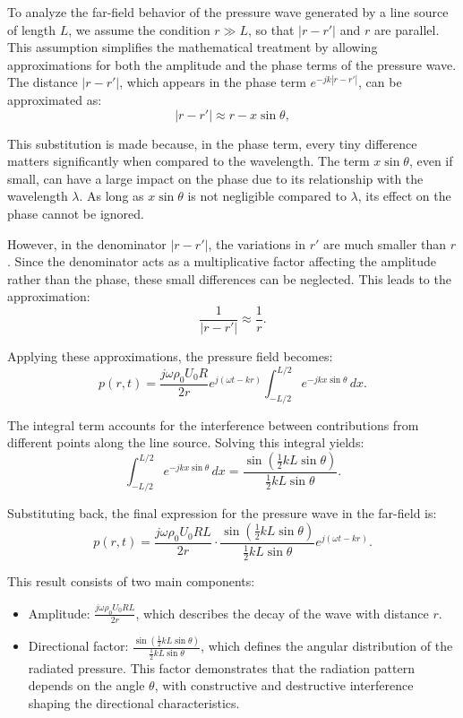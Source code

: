 \documentclass[a4paper]{article}
\begin{document}
To analyze the far-field behavior of the pressure wave generated by a line source of length \( L \), we assume the condition \( r \gg L \), so that \( |r - r'| \) and \( r \) are parallel. This assumption simplifies the mathematical treatment by allowing approximations for both the amplitude and the phase terms of the pressure wave.
The distance \( |r - r'| \), which appears in the phase term \( e^{-j k |r - r'|} \), can be approximated as:
\[
|r - r'| \approx r - x \sin \theta,
\]

This substitution is made because, in the phase term, every tiny difference matters significantly when compared to the wavelength. The term \( x \sin \theta \), even if small, can have a large impact on the phase due to its relationship with the wavelength \( \lambda \). As long as \( x \sin \theta \) is not negligible compared to \( \lambda \), its effect on the phase cannot be ignored.

However, in the denominator \( |r - r'| \), the variations in \( r' \) are much smaller than \( r \). Since the denominator acts as a multiplicative factor affecting the amplitude rather than the phase, these small differences can be neglected. This leads to the approximation:
\[
\frac{1}{|r - r'|} \approx \frac{1}{r}.
\]



Applying these approximations, the pressure field becomes:
\[
p(r, t) = \frac{j \omega \rho_0 U_0 R}{2 r} e^{j (\omega t - k r)} \int_{-L/2}^{L/2} e^{-j k x \sin \theta} \, dx.
\]

The integral term accounts for the interference between contributions from different points along the line source. Solving this integral yields:
\[
\int_{-L/2}^{L/2} e^{-j k x \sin \theta} \, dx = \frac{\sin \left( \frac{1}{2} k L \sin \theta \right)}{\frac{1}{2} k L \sin \theta}.
\]

Substituting back, the final expression for the pressure wave in the far-field is:
\[
p(r, t) = \frac{j \omega \rho_0 U_0 R L}{2 r} \cdot \frac{\sin \left( \frac{1}{2} k L \sin \theta \right)}{\frac{1}{2} k L \sin \theta} e^{j (\omega t - k r)}.
\]

This result consists of two main components:
\begin{itemize}
    \item Amplitude: \(\frac{j \omega \rho_0 U_0 R L}{2 r}\), which describes the decay of the wave with distance \( r \).
\item Directional factor: \(\frac{\sin \left( \frac{1}{2} k L \sin \theta \right)}{\frac{1}{2} k L \sin \theta}\), which defines the angular distribution of the radiated pressure. This factor demonstrates that the radiation pattern depends on the angle \( \theta \), with constructive and destructive interference shaping the directional characteristics.
\end{itemize}
\end{document}
